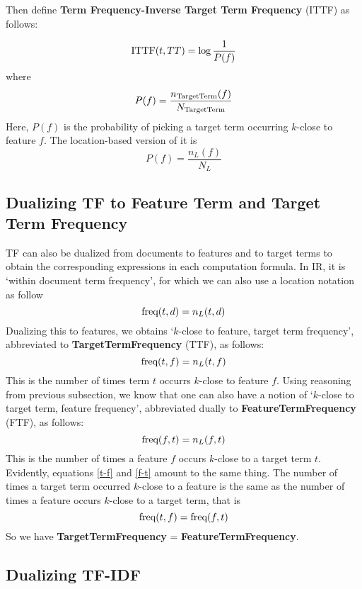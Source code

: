 Then define {\bf Term Frequency-Inverse Target Term Frequency} (ITTF) as follows:

\begin{equation}
\label{ittf}
 \textmd{ITTF}(t, TT) =  \log{\frac{1}{P(f)}}
\end{equation}
where
\[
P(f) =  \frac{n_{\textmd{TargetTerm}}(f)}{N_{\textmd{TargetTerm}}}
\]
Here, $P(f)$ is the  probability of picking a target term  occurring $k$-close to feature $f$.   The location-based version of it is
\[
P(f) = \frac{n_L(f)}{N_L}
\]


\subsection{Dualizing TF to Feature Term and Target Term Frequency}
\label{subsec-TF}

TF can also be dualized from documents to features and to target terms to obtain the corresponding expressions in each computation formula. In IR, it is `within document term frequency', for which we can also use a location notation as follow
\[
\textmd{freq}(t,d) = n_L(t,d)
\]
Dualizing this to features, we obtains `$k$-close to feature, target  term frequency', abbreviated to {\bf TargetTermFrequency} (TTF), as follows:
\begin{equation}
\label{t-f}
\textmd{freq}(t,f) = n_L(t,f)
\end{equation}
This is the number of times term $t$ occurrs $k$-close to feature $f$.  Using reasoning from previous subsection, we know that one can also have a notion of `$k$-close to target term, feature frequency', abbreviated dually to {\bf FeatureTermFrequency} (FTF), as follows:
\begin{equation}
\label{f-t}
\textmd{freq}(f,t) = n_L(f,t)
\end{equation}
This is the number of times a feature $f$ occurs $k$-close to a target term $t$.  Evidently, equations \ref{t-f} and \ref{f-t} amount to the same thing. The number of times a target term occurred $k$-close to a feature is the same as the number of times a feature occurs $k$-close to a target term, that is
\begin{equation}
\label{ttf=ftf}
\textmd{freq}(t,f) = \textmd{freq}(f,t) 
\end{equation}
So we have {\bf TargetTermFrequency}  = {\bf FeatureTermFrequency}. 

\subsection{Dualizing TF-IDF}
\label{subsec-TF-IDF}

